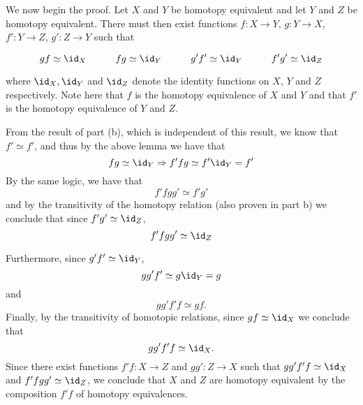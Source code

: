 \begin{homework}[e]
\begin{prf}
\begin{enumerate}[(a)]
			\bigskip
			
			We now begin the proof. Let $X$ and $Y$ be homotopy equivalent and let $Y$ and $Z$ be homotopy equivalent. There must then exist functions $f:X \rightarrow Y$, $g:Y \rightarrow X$, $f':Y \rightarrow Z$, $g':Z \rightarrow Y$ such that 
			
			\begin{equation*}
				gf \simeq \id_X \hspace{30pt} 
				fg \simeq \id_Y \hspace{30pt}
				g'f' \simeq \id_Y \hspace{30pt}
				f'g' \simeq \id_Z 
			\end{equation*}
			
			where $\id_X, \id_Y $ and $\id_Z$ denote the identity functions on $X$, $Y$ and $Z$ respectively. Note here that $f$ is the homotopy equivalence of $X$ and $Y$ and that $f'$ is the homotopy equivalence of $Y$ and $Z$. 
			
			From the result of part (b), which is independent of this result, we know that $f' \simeq f'$, and thus by the above lemma we have that
			\begin{equation*}
				fg \simeq \id_Y \Rightarrow f'fg \simeq f'\id_Y = f'
			\end{equation*}
			By the same logic, we have that 
			\begin{equation*}
				f'fgg' \simeq f'g' 
			\end{equation*}
			and by the transitivity of the homotopy relation (also proven in part b) we conclude that since $f'g' \simeq \id_Z$,
			\begin{equation*}
				f'fgg' \simeq \id_Z
			\end{equation*}
			
			\smallskip
			
			Furthermore, since $g'f' \simeq \id_Y$,
			\begin{equation*}
				gg'f' \simeq g\id_Y = g
			\end{equation*}
			and
			\begin{equation*}
				gg'f'f \simeq gf.
			\end{equation*}
			Finally, by the transitivity of homotopic relations, since $gf \simeq \id_X$ we conclude that 
			\begin{equation*}
				gg'f'f \simeq \id_X.
			\end{equation*}
			Since there exist functions $f'f: X \rightarrow Z$ and $gg':Z \rightarrow X$ such that $gg'f'f \simeq \id_X$ and $f'fgg' \simeq \id_Z$, we conclude that $X$ and $Z$ are homotopy equivalent by the composition $f'f$ of homotopy equivalences.


\end{enumerate}
\end{prf}
\end{homework}
